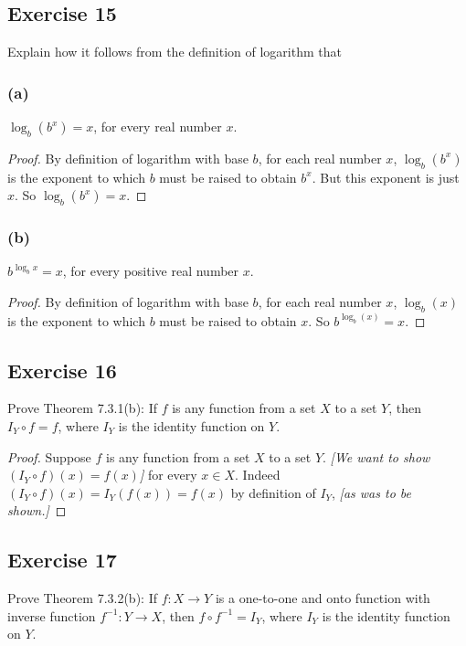 \documentclass[14pt]{extarticle}
\begin{document}
\subsection{Exercise 15}
Explain how it follows from the definition of logarithm that

\subsubsection{(a)}
\(\log_b(b^x) = x\), for every real number $x$.

\begin{proof}
By definition of logarithm with base $b$, for each real number $x$, \(\log_b(b^x)\) is the exponent to which $b$ 
must be raised to obtain $b^x$. But this exponent is just $x$. So \(\log_b(b^x) = x\).
\end{proof}

\subsubsection{(b)}
\(b^{\log_b x} = x\), for every positive real number $x$.

\begin{proof}
By definition of logarithm with base $b$, for each real number $x$, \(\log_b(x)\) is the exponent to which $b$ 
must be raised to obtain $x$. So \(b^{\log_b(x)} = x\).
\end{proof}

\subsection{Exercise 16}
Prove Theorem 7.3.1(b): If $f$ is any function from a set $X$ to a set $Y$, then \(I_Y \circ f = f\), where $I_Y$ is 
the identity function on $Y$.

\begin{proof}
Suppose $f$ is any function from a set $X$ to a set $Y$. {\it [We want to show \((I_Y \circ f)(x) = f(x)\)]} for 
every \(x \in X\). Indeed \((I_Y \circ f)(x) = I_Y(f(x)) = f(x)\) by definition of $I_Y$, {\it [as was to be shown.]}
\end{proof}

\subsection{Exercise 17}
Prove Theorem 7.3.2(b): If \(f: X \to Y\) is a one-to-one and onto function with inverse function \(f^{-1}:Y \to X\), 
then \(f \circ f^{-1} = I_Y\), where \(I_Y\) is the identity function on $Y$.
\end{document}

